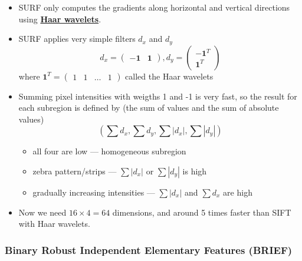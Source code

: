 \documentclass[twocolumn,landscape,10pt]{article}
\theoremstyle{definition}
\begin{document}
\begin{itemize}
    \item SURF only computes the gradients along horizontal and vertical
        directions using \underline{\textbf{Haar wavelets}}.
    \item SURF applies very simple filters $d_x$ and $d_y$
        \[
            d_x=
            \begin{pmatrix}
                -\mathbf{1} & \mathbf{1}
            \end{pmatrix},
            d_y=
            \begin{pmatrix}
                -\mathbf{1}^T \\
                \mathbf{1}^T
            \end{pmatrix} 
        \]
        where $\mathbf{1}^T=\begin{pmatrix}
            1 & 1 & \ldots & 1
        \end{pmatrix} $ called the Haar wavelets
    \item Summing pixel intensities with weigths 1 and -1 is very fast, so the
        result for each subregion is defined by (the sum of values and the sum
        of absolute values)
        \[
            \left(\sum d_x,\sum d_y, \sum|d_x|,\sum|d_y|\right)
        \]
        \begin{itemize}
            \item all four are low --- homogeneous subregion
            \item zebra pattern/strips --- $\sum|d_x|$ or $\sum|d_y|$ is high
            \item gradually increasing intensities --- $\sum|d_x|$ and $\sum d_x$ are
                high
        \end{itemize} 
    \item Now we need $16\times 4 = 64 $ dimensions, and around 5 times faster
        than SIFT with Haar wavelets.
\end{itemize} 

\subsubsection{Binary Robust Independent Elementary Features (BRIEF)}
\end{document}
